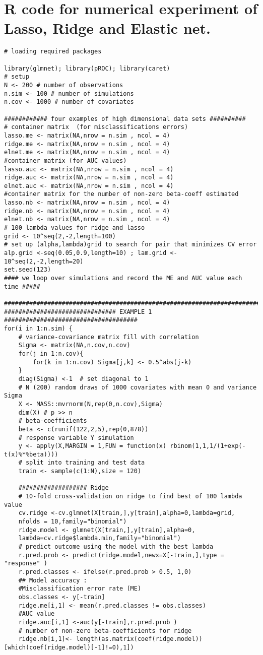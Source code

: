 \documentclass[12pt]{report}
\begin{document}
\section{R code for numerical experiment of Lasso, Ridge and Elastic net.}
\label{a1}
\begin{lstlisting}
# loading required packages

library(glmnet); library(pROC); library(caret)
# setup
N <- 200 # number of observations
n.sim <- 100 # number of simulations
n.cov <- 1000 # number of covariates

############ four examples of high dimensional data sets ##########
# container matrix  (for misclassifications errors)
lasso.me <- matrix(NA,nrow = n.sim , ncol = 4)
ridge.me <- matrix(NA,nrow = n.sim , ncol = 4)
elnet.me <- matrix(NA,nrow = n.sim , ncol = 4)
#container matrix (for AUC values)
lasso.auc <- matrix(NA,nrow = n.sim , ncol = 4)
ridge.auc <- matrix(NA,nrow = n.sim , ncol = 4)
elnet.auc <- matrix(NA,nrow = n.sim , ncol = 4)
#container matrix for the number of non-zero beta-coeff estimated
lasso.nb <- matrix(NA,nrow = n.sim , ncol = 4)
ridge.nb <- matrix(NA,nrow = n.sim , ncol = 4)
elnet.nb <- matrix(NA,nrow = n.sim , ncol = 4)
# 100 lambda values for ridge and lasso
grid <- 10^seq(2,-2,length=100) 
# set up (alpha,lambda)grid to search for pair that minimizes CV error
alp.grid <-seq(0.05,0.9,length=10) ; lam.grid <- 10^seq(2,-2,length=20)
set.seed(123)
#### we loop over simulations and record the ME and AUC value each time #####

###############################################################################
############################### EXAMPLE 1 #####################################
for(i in 1:n.sim) {
	# variance-covariance matrix fill with correlation
	Sigma <- matrix(NA,n.cov,n.cov) 
	for(j in 1:n.cov){
		for(k in 1:n.cov) Sigma[j,k] <- 0.5^abs(j-k)
	}
	diag(Sigma) <-1  # set diagonal to 1
	# N (200) random draws of 1000 covariates with mean 0 and variance Sigma
	X <- MASS::mvrnorm(N,rep(0,n.cov),Sigma)
	dim(X) # p >> n 
	# beta-coefficients
	beta <- c(runif(122,2,5),rep(0,878))
	# response variable Y simulation
	y <- apply(X,MARGIN = 1,FUN = function(x) rbinom(1,1,1/(1+exp(-t(x)%*%beta))))
	# split into training and test data
	train <- sample(c(1:N),size = 120)
	
	################### Ridge
	# 10-fold cross-validation on ridge to find best of 100 lambda value
	cv.ridge <-cv.glmnet(X[train,],y[train],alpha=0,lambda=grid,
	nfolds = 10,family="binomial")
	ridge.model <- glmnet(X[train,],y[train],alpha=0,
	lambda=cv.ridge$lambda.min,family="binomial")
	# predict outcome using the model with the best lambda
	r.pred.prob <- predict(ridge.model,newx=X[-train,],type = "response" )
	r.pred.classes <- ifelse(r.pred.prob > 0.5, 1,0)
	## Model accuracy :
	#Misclassification error rate (ME)
	obs.classes <- y[-train]
	ridge.me[i,1] <- mean(r.pred.classes != obs.classes)
	#AUC value
	ridge.auc[i,1] <-auc(y[-train],r.pred.prob )
	# number of non-zero beta-coefficients for ridge
	ridge.nb[i,1]<- length(as.matrix(coef(ridge.model))[which(coef(ridge.model)[-1]!=0),1])
	

\end{lstlisting}
\end{document}
